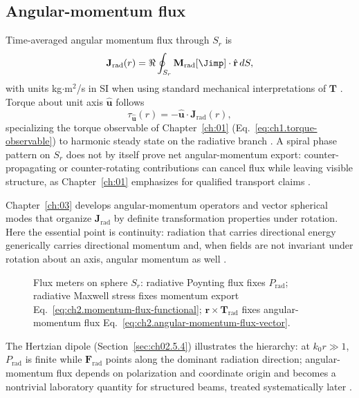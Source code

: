 \subsection{Angular-momentum flux}
\label{sec:ch02.5b.3}

Time-averaged angular momentum flux through $S_r$ is
\begin{equation}
\label{eq:ch2.angular-momentum-flux-vector}
\mathbf{J}_{\mathrm{rad}}(r)
=
\Re\oint_{S_r}\mathbf{M}_{\mathrm{rad}}[\Jimp]\cdot\hat{\mathbf{r}}\,dS,
\end{equation}
with units kg$\cdot$m$^2$/s in SI when using standard mechanical interpretations of $\mathbf{T}$ \cite{stratton1941}. Torque about unit axis $\hat{\mathbf{u}}$ follows
\begin{equation}
\label{eq:ch2.angular-flux-functional}
\tau_{\hat{\mathbf{u}}}(r)
=
-\hat{\mathbf{u}}\cdot\mathbf{J}_{\mathrm{rad}}(r),
\end{equation}
specializing the torque observable of Chapter~\ref{ch:01} (Eq.~\eqref{eq:ch1.torque-observable}) to harmonic steady state on the radiative branch \cite{beth1936,stratton1941}. A spiral phase pattern on $S_r$ does not by itself prove net angular-momentum export: counter-propagating or counter-rotating contributions can cancel flux while leaving visible structure, as Chapter~\ref{ch:01} emphasizes for qualified transport claims \cite{allen1992,stratton1941}.

Chapter~\ref{ch:03} develops angular-momentum operators and vector spherical modes that organize $\mathbf{J}_{\mathrm{rad}}$ by definite transformation properties under rotation. Here the essential point is continuity: radiation that carries directional energy generically carries directional momentum and, when fields are not invariant under rotation about an axis, angular momentum as well \cite{stratton1941,jackson1999}.

\begin{figure}[t]
\centering
{}
\caption{Flux meters on sphere $S_r$: radiative Poynting flux fixes $P_{\mathrm{rad}}$; radiative Maxwell stress fixes momentum export Eq.~\eqref{eq:ch2.momentum-flux-functional}; $\mathbf{r}\times\mathbf{T}_{\mathrm{rad}}$ fixes angular-momentum flux Eq.~\eqref{eq:ch2.angular-momentum-flux-vector}.}
\label{fig:ch2.momentum-flux-sphere}
\end{figure}

The Hertzian dipole (Section~\ref{sec:ch02.5.4}) illustrates the hierarchy: at $k_0 r\gg1$, $P_{\mathrm{rad}}$ is finite while $\mathbf{F}_{\mathrm{rad}}$ points along the dominant radiation direction; angular-momentum flux depends on polarization and coordinate origin and becomes a nontrivial laboratory quantity for structured beams, treated systematically later \cite{jackson1999,stratton1941}.
